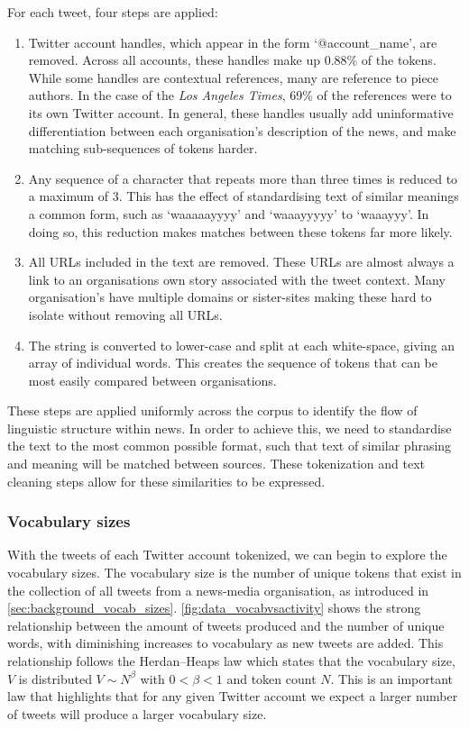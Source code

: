 For each tweet, four steps are applied:
\begin{enumerate}
	\item Twitter account handles, which appear in the form `@account\_name', are removed. Across all accounts, these handles make up 0.88\% of the tokens. While some handles are contextual references, many are reference to piece authors. In the case of the \emph{Los Angeles Times}, 69\% of the references were to its own Twitter account. In general, these handles usually add uninformative differentiation between each organisation's description of the news, and make matching sub-sequences of tokens harder.
	\item Any sequence of a character that repeats more than three times is reduced to a maximum of 3. This has the effect of standardising text of similar meanings a common form, such as `waaaaayyyy' and `waaayyyyy' to `waaayyy'. In doing so, this reduction makes matches between these tokens far more likely.
	\item All URLs included in the text are removed. These URLs are almost always a link to an organisations own story associated with the tweet context. Many organisation's have multiple domains or sister-sites making these hard to isolate without removing all URLs.  
	\item The string is converted to lower-case and split at each white-space, giving an array of individual words. This creates the sequence of tokens that can be most easily compared between organisations.
\end{enumerate}

These steps are applied uniformly across the corpus to identify the flow of linguistic structure within news. In order to achieve this, we need to standardise the text to the most common possible format, such that text of similar phrasing and meaning will be matched between sources. These tokenization and text cleaning steps allow for these similarities to be expressed.


\subsubsection{Vocabulary sizes}\label{sec:vocabsizes}

With the tweets of each Twitter account tokenized, we can begin to explore the vocabulary sizes. The vocabulary size is the number of unique tokens that exist in the collection of all tweets from a news-media organisation, as introduced in \autoref{sec:background_vocab_sizes}. \autoref{fig:data_vocabvsactivity} shows the strong relationship between the amount of tweets produced and the number of unique words, with diminishing increases to vocabulary as new tweets are added. This relationship follows the Herdan–Heaps law \cite{herdan1960type, heaps_law_1978} which states that the vocabulary size, $V$ is distributed $V \sim N^{\beta}$ with $0 < \beta < 1$ and token count $N$. This is an important law that highlights that for any given Twitter account we expect a larger number of tweets will produce a larger vocabulary size.


